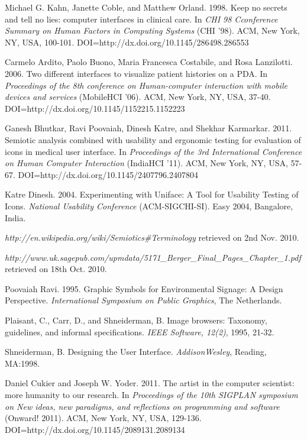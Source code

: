 \begin{thebibliography}{}

\bibitem{} Michael G. Kahn, Janette Coble, and Matthew Orland. 1998. Keep no secrets and tell no lies: computer interfaces in clinical care. In \emph{CHI 98 Cconference Summary on Human Factors in Computing Systems} (CHI '98). ACM, New York, NY, USA, 100-101. DOI=http://dx.doi.org/10.1145/286498.286553

\bibitem{} Carmelo Ardito, Paolo Buono, Maria Francesca Costabile, and Rosa Lanzilotti. 2006. Two different interfaces to visualize patient histories on a PDA. In \emph{Proceedings of the 8th conference on Human-computer interaction with mobile devices and services} (MobileHCI '06). ACM, New York, NY, USA, 37-40. DOI=http://dx.doi.org/10.1145/1152215.1152223

\bibitem{} Ganesh Bhutkar, Ravi Poovaiah, Dinesh Katre, and Shekhar Karmarkar. 2011. Semiotic analysis combined with usability and ergonomic testing for evaluation of icons in medical user interface. In \emph{Proceedings of the 3rd International Conference on Human Computer Interaction} (IndiaHCI '11). ACM, New York, NY, USA, 57-67. DOI=http://dx.doi.org/10.1145/2407796.2407804

\bibitem{} Katre Dinesh. 2004. Experimenting with Uniface: A Tool for
Usability Testing of Icons. \emph{National Usability Conference} (ACM-SIGCHI-SI). Easy 2004, Bangalore, India.

\bibitem{} \emph{http://en.wikipedia.org/wiki/Semiotics\#Terminology} retrieved
on 2nd Nov. 2010.

\bibitem{} \emph{http://www.uk.sagepub.com/upmdata/5171\_Berger\_Final\_Pages\_Chapter\_1.pdf} retrieved on 18th Oct. 2010.

\bibitem{} Poovaiah Ravi. 1995. Graphic Symbols for Environmental
Signage: A Design Perspective. \emph{International Symposium on
Public Graphics}, The Netherlands.

\bibitem{} Plaisant, C., Carr, D., and Shneiderman, B. Image browsers:
Taxonomy, guidelines, and informal specifications. \emph{IEEE
Software, 12(2)}, 1995, 21-32.

\bibitem{} Shneiderman, B. Designing the User Interface. \emph{AddisonWesley},
Reading, MA:1998.

\bibitem{} Daniel Cukier and Joseph W. Yoder. 2011. The artist in the computer scientist: more humanity to our research. In \emph{Proceedings of the 10th SIGPLAN symposium on New ideas, new paradigms, and reflections on programming and software} (Onward! 2011). ACM, New York, NY, USA, 129-136. DOI=http://dx.doi.org/10.1145/2089131.2089134


\end{thebibliography}
